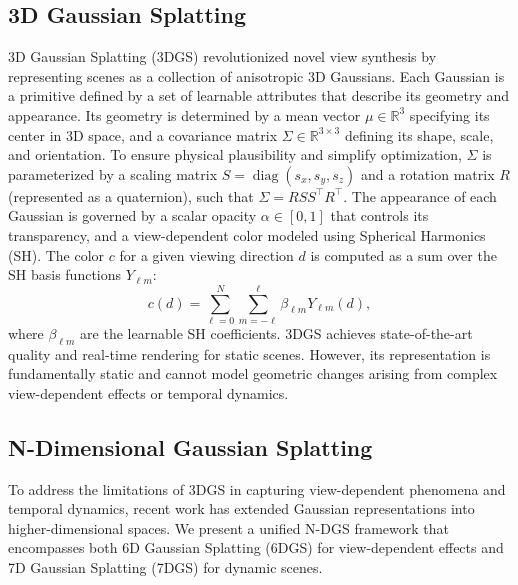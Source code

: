 \documentclass{article}
\begin{document}
\subsection{3D Gaussian Splatting}
3D Gaussian Splatting (3DGS) revolutionized novel view synthesis by representing scenes as a collection of anisotropic 3D Gaussians. Each Gaussian is a primitive defined by a set of learnable attributes that describe its geometry and appearance. Its geometry is determined by a mean vector \(\mu \in \mathbb{R}^3\) specifying its center in 3D space, and a covariance matrix \(\Sigma \in \mathbb{R}^{3 \times 3}\) defining its shape, scale, and orientation. To ensure physical plausibility and simplify optimization, \(\Sigma\) is parameterized by a scaling matrix \(S = \operatorname{diag}(s_x, s_y, s_z)\) and a rotation matrix \(R\) (represented as a quaternion), such that \(\Sigma = R S S^\top R^\top\). The appearance of each Gaussian is governed by a scalar opacity \(\alpha \in [0, 1]\) that controls its transparency, and a view-dependent color modeled using Spherical Harmonics (SH). The color \(c\) for a given viewing direction \(d\) is computed as a sum over the SH basis functions \(Y_{\ell m}\):
\begin{equation}
c(d) = \sum_{\ell=0}^{N} \sum_{m=-\ell}^{\ell} \beta_{\ell m} Y_{\ell m}(d),
\end{equation}
where \(\beta_{\ell m}\) are the learnable SH coefficients. 3DGS achieves state-of-the-art quality and real-time rendering for static scenes. However, its representation is fundamentally static and cannot model geometric changes arising from complex view-dependent effects or temporal dynamics.

\subsection{N-Dimensional Gaussian Splatting}

To address the limitations of 3DGS in capturing view-dependent phenomena and temporal dynamics, recent work has extended Gaussian representations into higher-dimensional spaces. We present a unified N-DGS framework that encompasses both 6D Gaussian Splatting (6DGS) for view-dependent effects and 7D Gaussian Splatting (7DGS) for dynamic scenes.
\end{document}
